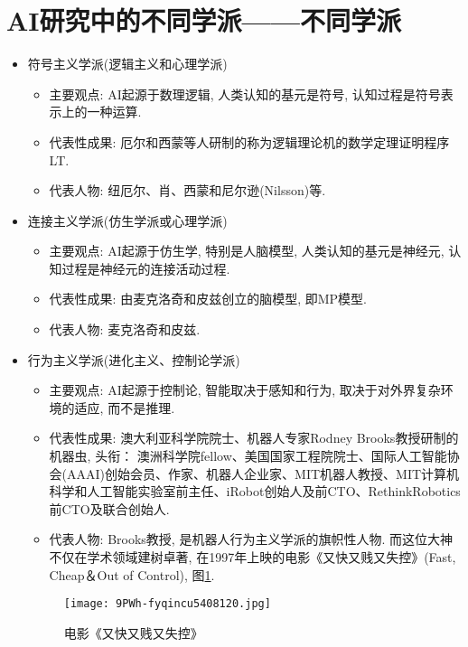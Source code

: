 \section{AI研究中的不同学派——不同学派}
\begin{itemize}
\item 符号主义学派(逻辑主义和心理学派)
     \begin{itemize}
       \item 主要观点: AI起源于数理逻辑, 人类认知的基元是符号, 认知过程是符号表示上的一种运算.
       \item 代表性成果: 厄尔和西蒙等人研制的称为逻辑理论机的数学定理证明程序LT.
       \item 代表人物: 纽厄尔、肖、西蒙和尼尔逊(Nilsson)等.
    \end{itemize}
\item 连接主义学派(仿生学派或心理学派)
     \begin{itemize}
       \item 主要观点: AI起源于仿生学, 特别是人脑模型, 人类认知的基元是神经元, 认知过程是神经元的连接活动过程.
      \item 代表性成果: 由麦克洛奇和皮兹创立的脑模型, 即MP模型.
      \item 代表人物: 麦克洛奇和皮兹.
    \end{itemize}
\item 行为主义学派(进化主义、控制论学派)
     \begin{itemize}
        \item 主要观点: AI起源于控制论, 智能取决于感知和行为, 取决于对外界复杂环境的适应, 而不是推理.
        \item 代表性成果: 澳大利亚科学院院士、机器人专家Rodney Brooks教授研制的机器虫,  头衔： 澳洲科学院fellow、美国国家工程院院士、国际人工智能协会(AAAI)创始会员、作家、机器人企业家、MIT机器人教授、MIT计算机科学和人工智能实验室前主任、iRobot创始人及前CTO、RethinkRobotics前CTO及联合创始人.
        \item 代表人物:  Brooks教授,  是机器人行为主义学派的旗帜性人物. 而这位大神不仅在学术领域建树卓著, 在1997年上映的电影《又快又贱又失控》(Fast,  Cheap＆Out of Control),  图\ref{AI:fyqincu540Fig2}.
    \end{itemize}
\begin{figure}[htbp]
	\centering
	\texttt{[image: 9PWh-fyqincu5408120.jpg]}
	\caption{电影《又快又贱又失控》}
   \label{AI:fyqincu540Fig2}
\end{figure}

\end{itemize}
